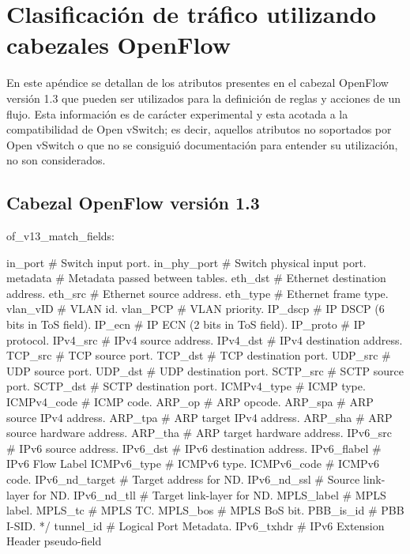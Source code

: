 
\chapter{Clasificaci\'on de tr\'afico utilizando cabezales OpenFlow}
\label{appendix3}

En este ap\'endice se detallan de los atributos presentes en el cabezal OpenFlow versi\'on 1.3 que pueden ser utilizados para la definici\'on de reglas y acciones de un flujo. Esta informaci\'on es de carácter experimental y esta acotada a la compatibilidad de Open vSwitch; es decir, aquellos atributos no soportados por Open vSwitch o que no se consiguió documentaci\'on para entender su utilizaci\'on, no son considerados.

\section{Cabezal OpenFlow versi\'on 1.3} 

\begin{python}
of_v13_match_fields:
      
	in_port			# Switch input port.
	in_phy_port 	# Switch physical input port. 
	metadata 		# Metadata passed between tables. 
	eth_dst 		# Ethernet destination address.
	eth_src 		# Ethernet source address. 
	eth_type 		# Ethernet frame type. 
	vlan_vID 		# VLAN id. 
	vlan_PCP		# VLAN priority. 
	IP_dscp 		# IP DSCP (6 bits in ToS field). 
	IP_ecn  		# IP ECN (2 bits in ToS field). 
	IP_proto		# IP protocol. 
	IPv4_src 		# IPv4 source address. 
	IPv4_dst 		# IPv4 destination address. 
	TCP_src 		# TCP source port. 
	TCP_dst 		# TCP destination port. 
	UDP_src 		# UDP source port. 
	UDP_dst 		# UDP destination port. 
	SCTP_src 		# SCTP source port. 
	SCTP_dst 		# SCTP destination port. 
	ICMPv4_type 	# ICMP type. 
	ICMPv4_code 	# ICMP code. 
	ARP_op			# ARP opcode. 
	ARP_spa 		# ARP source IPv4 address. 
	ARP_tpa 		# ARP target IPv4 address. 
	ARP_sha 		# ARP source hardware address. 
	ARP_tha 		# ARP target hardware address. 
	IPv6_src 		# IPv6 source address. 
	IPv6_dst 		# IPv6 destination address. 
	IPv6_flabel 	# IPv6 Flow Label 
	ICMPv6_type 	# ICMPv6 type. 
	ICMPv6_code 	# ICMPv6 code. 
	IPv6_nd_target 	# Target address for ND. 
	IPv6_nd_ssl 	# Source link-layer for ND. 
	IPv6_nd_tll  	# Target link-layer for ND. 
	MPLS_label 		# MPLS label. 
	MPLS_tc 		# MPLS TC. 
	MPLS_bos		# MPLS BoS bit. 
	PBB_is_id 		# PBB I-SID. */
	tunnel_id 		# Logical Port Metadata. 
	IPv6_txhdr 		# IPv6 Extension Header pseudo-field 
		
\end{python}

